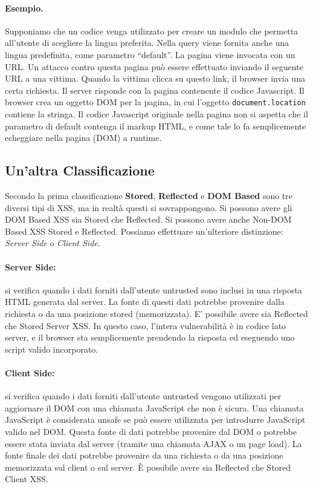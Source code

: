\paragraph{Esempio.}
Supponiamo che un codice venga utilizzato per creare un modulo che permetta all'utente di scegliere la lingua preferita. Nella query viene fornita anche una lingua
predefinita, come parametro ``default''.
La pagina viene invocata con un URL. Un attacco contro questa pagina può essere effettuato inviando il seguente URL a una vittima. Quando la vittima clicca su
questo link, il browser invia una certa richiesta. Il server risponde con la pagina contenente il codice Javascript. Il browser crea un oggetto DOM per la pagina, in cui l'oggetto \verb|document.location| contiene la stringa.
Il codice Javascript originale nella pagina non si aspetta che il parametro di default contenga il markup HTML, e come tale lo fa semplicemente echeggiare nella pagina (DOM) a runtime.

\subsection{Un'altra Classificazione}

Secondo la prima classificazione \textbf{Stored}, \textbf{Reflected} e \textbf{DOM Based} sono tre diversi tipi di XSS, ma in realtà questi si sovrappongono. Si possono avere gli DOM Based XSS sia Stored che Reflected. Si possono avere anche Non-DOM Based XSS Stored e Reflected.
Possiamo effettuare un'ulteriore distinzione: \textit{Server Side} o \textit{Client Side}.

\paragraph{Server Side: } si verifica quando i dati forniti dall'utente untrusted sono inclusi in una
risposta HTML generata dal server. La fonte di questi dati potrebbe provenire dalla richiesta o da una posizione stored (memorizzata).
E' possibile avere sia Reflected che Stored Server XSS.
In questo caso, l'intera vulnerabilità è in codice lato server, e il browser sta semplicemente prendendo la risposta ed eseguendo uno script valido incorporato.

\paragraph{Client Side: } si verifica quando i dati forniti dall'utente untrusted vengono utilizzati per
aggiornare il DOM con una chiamata JavaScript che non è sicura. Una chiamata JavaScript è considerata unsafe se può essere utilizzata per introdurre JavaScript
valido nel DOM.
Questa fonte di dati potrebbe provenire dal DOM o potrebbe essere stata inviata dal server (tramite una chiamata AJAX o un page load). La fonte finale dei
dati potrebbe provenire da una richiesta o da una posizione memorizzata sul client o sul server.
È possibile avere sia Reflected che Stored Client XSS.

